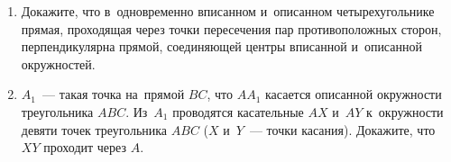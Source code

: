 \begin{enumerate}
\item
Докажите, что в~одновременно вписанном и~описанном четырехугольнике прямая,
проходящая через точки пересечения пар противоположных сторон, перпендикулярна
прямой, соединяющей центры вписанной и~описанной окружностей.

\item
$A_1$~--- такая точка на~прямой $BC$, что $A A_1$ касается описанной окружности
треугольника $ABC$.
Из~$A_1$ проводятся касательные $AX$ и~$AY$ к~окружности девяти точек
треугольника $ABC$ ($X$ и~$Y$~--- точки касания).
Докажите, что $XY$ проходит через $A$.

\end{enumerate}

